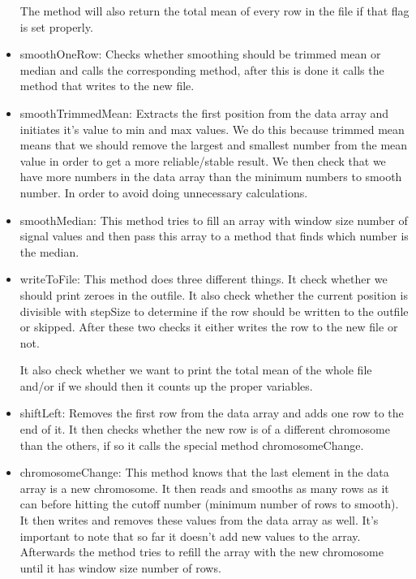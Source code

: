 \begin{itemize}
The method will also return the total mean of every row in the file if that flag is set properly.

\item smoothOneRow: Checks whether smoothing should be trimmed mean or median and calls the corresponding method, after this is done it calls the method that writes to the new file.

\item smoothTrimmedMean: Extracts the first position from the data array and initiates it's value to min and max values. We do this because trimmed mean means that we should remove the largest and smallest number from the mean value in order to get a more reliable/stable result. We then check that we have more numbers in the data array than the minimum numbers to smooth number. In order to avoid doing unnecessary calculations. 

\item smoothMedian: This method tries to fill an array with window size number of signal values and then pass this array to a method that finds which number is the median.

\item writeToFile: This method does three different things. It check whether we should print zeroes in the outfile. It also check whether the current position is divisible with stepSize to determine if the row should be written to the outfile or skipped.  After these two checks it either writes the row to the new file or not.

It also check whether we want to print the total mean of the whole file and/or if we should then it counts up the proper variables.

\item shiftLeft: Removes the first row from the data array and adds one row to the end of it.  It then checks whether the new row is of a different chromosome than the others, if so it calls the special method chromosomeChange.

\item chromosomeChange: This method knows that the last element in the data array is a new chromosome. It then reads and smooths as many rows as it can before hitting the cutoff number (minimum number of rows to smooth). It then writes and removes these values from the data array as well. It's important to note that so far it doesn't add new values to the array. Afterwards the method tries to refill the array with the new chromosome until it has window size number of rows.



\end{itemize}



 
